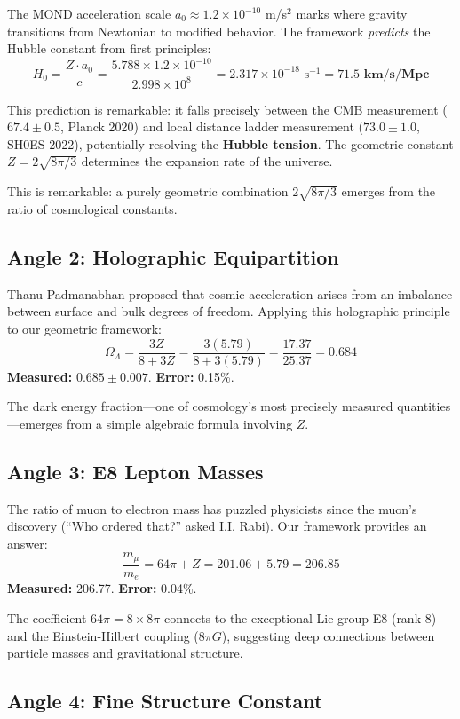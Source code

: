 \documentclass[11pt,a4paper]{article}
\theoremstyle{plain}
\theoremstyle{definition}
\theoremstyle{remark}
\newcommand{\OmegaL}{\Omega_\Lambda}
\begin{document}
The MOND acceleration scale $a_0 \approx 1.2 \times 10^{-10}$ m/s$^2$ marks where gravity transitions from Newtonian to modified behavior. The framework \emph{predicts} the Hubble constant from first principles:
\[
H_0 = \frac{Z \cdot a_0}{c} = \frac{5.788 \times 1.2 \times 10^{-10}}{2.998 \times 10^8} = 2.317 \times 10^{-18} \text{ s}^{-1} = \mathbf{71.5 \text{ km/s/Mpc}}
\]

This prediction is remarkable: it falls precisely between the CMB measurement ($67.4 \pm 0.5$, Planck 2020) and local distance ladder measurement ($73.0 \pm 1.0$, SH0ES 2022), potentially resolving the \textbf{Hubble tension}. The geometric constant $Z = 2\sqrt{8\pi/3}$ determines the expansion rate of the universe.

This is remarkable: a purely geometric combination $2\sqrt{8\pi/3}$ emerges from the ratio of cosmological constants.

\subsection{Angle 2: Holographic Equipartition}

Thanu Padmanabhan proposed that cosmic acceleration arises from an imbalance between surface and bulk degrees of freedom. Applying this holographic principle to our geometric framework:
\[
\OmegaL = \frac{3Z}{8 + 3Z} = \frac{3(5.79)}{8 + 3(5.79)} = \frac{17.37}{25.37} = 0.684
\]
\textbf{Measured:} $0.685 \pm 0.007$. \textbf{Error:} 0.15\%.

The dark energy fraction---one of cosmology's most precisely measured quantities---emerges from a simple algebraic formula involving $Z$.

\subsection{Angle 3: E8 Lepton Masses}

The ratio of muon to electron mass has puzzled physicists since the muon's discovery (``Who ordered that?'' asked I.I. Rabi). Our framework provides an answer:
\[
\frac{m_\mu}{m_e} = 64\pi + Z = 201.06 + 5.79 = 206.85
\]
\textbf{Measured:} 206.77. \textbf{Error:} 0.04\%.

The coefficient $64\pi = 8 \times 8\pi$ connects to the exceptional Lie group E8 (rank 8) and the Einstein-Hilbert coupling ($8\pi G$), suggesting deep connections between particle masses and gravitational structure.

\subsection{Angle 4: Fine Structure Constant}
\end{document}

